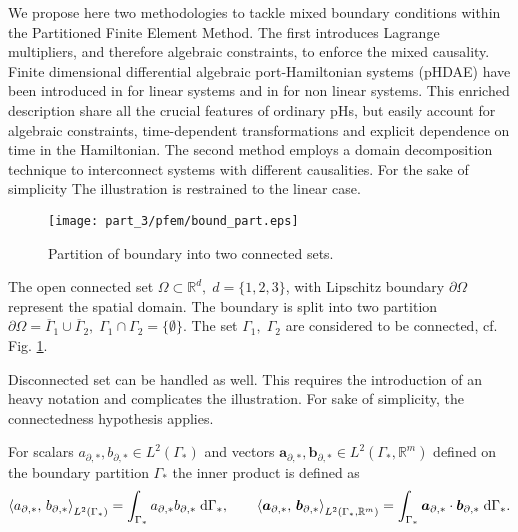 We propose here two methodologies to tackle mixed boundary conditions within the Partitioned Finite Element Method. The first introduces Lagrange multipliers, and therefore algebraic constraints, to enforce the mixed causality. Finite dimensional differential algebraic port-Hamiltonian systems (pHDAE) have been introduced in \cite{beattie2018linear} for linear systems and in \cite{morandin2019} for non linear systems. This enriched description share all the crucial features of ordinary pHs, but easily account for algebraic constraints, time-dependent transformations and explicit dependence on time in the Hamiltonian. The second method employs a domain decomposition technique to interconnect systems with different causalities. For the sake of simplicity The illustration is restrained to the linear case. \\

\begin{figure}[tb]
	\centering
	\texttt{[image: part\_3/pfem/bound\_part.eps]}
	\caption{Partition of boundary into two connected sets.}
	\label{fig:bound_part}
\end{figure}

The open connected set $\Omega \subset \mathbb{R}^d, \; d=\{1,2,3\}$, with Lipschitz boundary $\partial\Omega$ represent the spatial domain. The boundary is split into two partition $\partial\Omega = \overline{\Gamma}_1 \cup \overline{\Gamma}_2, \; \Gamma_1 \cap \Gamma_2 = \{\emptyset\}$. The set $\Gamma_1, \; \Gamma_2$ are considered to be connected, cf. Fig. \ref{fig:bound_part}.

\begin{remark}
	Disconnected set can be handled as well. This requires the introduction of an heavy notation and complicates the illustration. For sake of simplicity, the connectedness hypothesis applies.
\end{remark}
For scalars ${a}_{\partial, *}, {b}_{\partial, *} \in L^2(\Gamma_*)$ and  vectors  $\bm{a}_{\partial, *}, \bm{b}_{\partial, *} \in L^2(\Gamma_*, \mathbb{R}^m)$ defined on the boundary partition $\Gamma_*$ the inner product is defined as
\begin{equation}
\inner[L^2(\Gamma_*)]{a_{\partial, *}}{b_{\partial, *}} = \int_{\Gamma_*} a_{\partial, *} b_{\partial, *} \d{\Gamma_*}, \qquad \inner[L^2(\Gamma_*, \mathbb{R}^m)]{\bm{a}_{\partial, *}}{\bm{b}_{\partial, *}} = \int_{\Gamma_*} \bm{a}_{\partial, *} \cdot \bm{b}_{\partial, *} \d{\Gamma_*}.  
\end{equation}   

